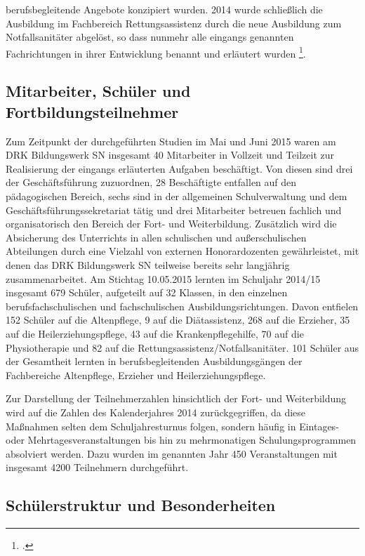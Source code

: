 berufsbegleitende Angebote konzipiert wurden. 2014 wurde schließlich die Ausbildung im Fachbereich Rettungsassistenz durch die neue Ausbildung zum Notfallsanitäter abgelöst, so dass nunmehr alle eingangs genannten Fachrichtungen in ihrer Entwicklung benannt und erläutert wurden \footcite[vgl.]{DRKBS2015}.

\subsection{Mitarbeiter, Schüler und Fortbildungsteilnehmer}
\label{sec:MitarbeiterSchülerUndFortbildungsteilnehmer}

Zum Zeitpunkt der durchgeführten Studien im Mai und Juni 2015 waren am DRK Bildungswerk SN insgesamt 40 Mitarbeiter in Vollzeit und Teilzeit zur Realisierung der eingangs erläuterten Aufgaben beschäftigt. Von diesen sind drei der Geschäftsführung zuzuordnen, 28 Beschäftigte entfallen auf den pädagogischen Bereich, sechs sind in der allgemeinen Schulverwaltung und dem Geschäftsführungssekretariat tätig und drei Mitarbeiter betreuen fachlich und organisatorisch den Bereich der Fort- und Weiterbildung. Zusätzlich wird die Absicherung des Unterrichts in allen schulischen und außerschulischen Abteilungen durch eine Vielzahl von externen Honorardozenten gewährleistet, mit denen das DRK Bildungswerk SN teilweise bereits sehr langjährig zusammenarbeitet. 
Am Stichtag 10.05.2015 lernten im Schuljahr 2014/15 insgesamt 679 Schüler, aufgeteilt auf 32 Klassen, in den einzelnen berufsfachschulischen und fachschulischen Ausbildungsrichtungen. Davon entfielen 152 Schüler auf die Altenpflege, 9 auf die Diätassistenz, 268 auf die Erzieher, 35 auf die Heilerziehungspflege, 43 auf die Krankenpflegehilfe, 70 auf die Physiotherapie und 82 auf die Rettungsassistenz/Notfallsanitäter. 101 Schüler aus der Gesamtheit lernten in berufsbegleitenden Ausbildungsgängen der Fachbereiche Altenpflege, Erzieher und Heilerziehungspflege. 

Zur Darstellung der Teilnehmerzahlen hinsichtlich der Fort- und Weiterbildung wird auf die Zahlen des Kalenderjahres 2014 zurückgegriffen, da diese Maßnahmen selten dem Schuljahresturnus folgen, sondern häufig in Eintages- oder Mehrtagesveranstaltungen bis hin zu mehrmonatigen Schulungsprogrammen absolviert werden. Dazu wurden im genannten Jahr 450 Veranstaltungen mit insgesamt 4200 Teilnehmern durchgeführt.

\subsection{Schülerstruktur und Besonderheiten}
\label{sec:SchülerstrukturUndBesonderheiten}

